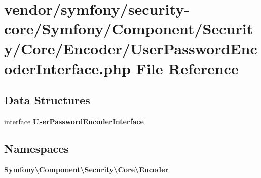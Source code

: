 \section{vendor/symfony/security-\/core/\+Symfony/\+Component/\+Security/\+Core/\+Encoder/\+User\+Password\+Encoder\+Interface.php File Reference}
\label{_user_password_encoder_interface_8php}
\subsection*{Data Structures}
\begin{DoxyCompactItemize}
\item 
interface {\bf User\+Password\+Encoder\+Interface}
\end{DoxyCompactItemize}
\subsection*{Namespaces}
\begin{DoxyCompactItemize}
\item 
 {\bf Symfony\textbackslash{}\+Component\textbackslash{}\+Security\textbackslash{}\+Core\textbackslash{}\+Encoder}
\end{DoxyCompactItemize}
